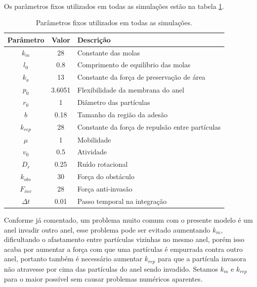 \documentclass{article}
\theoremstyle{definition}
\begin{document}
\paragraph{}
Os parâmetros fixos utilizados em todas as simulações estão na tabela \ref{tab:fix_pars}.
\begin{table}[h]
    \centering
    \begin{tabular}{||c|c|l||}
        \hline
        Parâmetro & Valor & Descrição \\
        \hline \hline
        $k_m$ & 28 & Constante das molas \\
        \hline
        $l_0$ & 0.8 & Comprimento de equilíbrio das molas \\
        \hline
        $k_a$ & 13 & Constante da força de preservação de área \\
        \hline
        $p_0$ & 3.6051 & Flexibilidade da membrana do anel \\
        \hline
        $r_0$ & 1 & Diâmetro das partículas \\
        \hline
        $b$ & 0.18 & Tamanho da região da adesão \\
        \hline
        $k_{rep}$ & 28 & Constante da força de repulsão entre partículas \\
        \hline
        $\mu$ & 1 & Mobilidade \\
        \hline
        $v_0$ & 0.5 & Atividade \\
        \hline
        $D_r$ & 0.25 & Ruído rotacional \\
        \hline
        $k_{obs}$ & 30 & Força do obstáculo \\
        \hline
        $F_{inv}$ & 28 & Força anti-invasão \\
        \hline
        $\Delta t$ & 0.01 & Passo temporal na integração \\
        \hline
    \end{tabular}
    \caption{Parâmetros fixos utilizados em todas as simulações.}
    \label{tab:fix_pars}
\end{table}
Conforme já comentado, um problema muito comum com o presente modelo é um anel invadir outro anel, esse problema pode ser evitado aumentando $k_m$, dificultando o afastamento entre partículas vizinhas no mesmo anel, porém isso acaba por aumentar a força com que uma partículas é empurrada contra outro anel, portanto também é necessário aumentar $k_{rep}$ para que a partícula invasora não atravesse por cima das partículas do anel sendo invadido. Setamos $k_m$ e $k_{rep}$ para o maior possível sem causar problemas numéricos aparentes.
\end{document}
